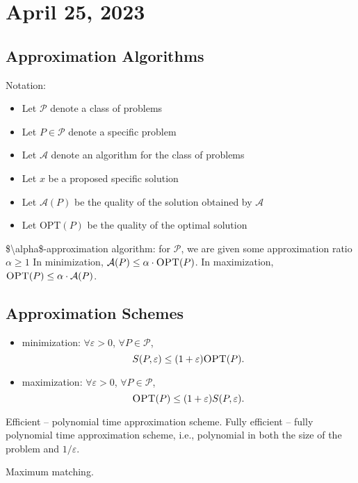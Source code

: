 \section{April 25, 2023}

\subsection{Approximation Algorithms}

Notation:
\begin{itemize}
    \item Let $\mathcal{P}$ denote a class of problems
    \item Let $P\in \mathcal{P}$ denote a specific problem 
    \item Let $\mathcal{A}$ denote an algorithm for the class of problems
    \item Let $x$ be a proposed specific solution
    \item Let $\mathcal{A}(P)$ be the quality of the solution obtained by $\mathcal{A}$
    \item Let \textsc{OPT}$(P)$ be the quality of the optimal solution
\end{itemize}

\ac{$\alpha$-approximation algorithm}: for $\mathcal{P}$, we are given some approximation ratio $\alpha \geq 1$ In minimization, $\mathcal{A}(P)\leq \alpha\cdot \textsc{OPT}(P)$. In maximization, $\textsc{OPT}(P)\leq \alpha\cdot \mathcal{A}(P)$.

\subsection{Approximation Schemes}

\begin{itemize}
    \item minimization: $\forall \varepsilon > 0$, $\forall P\in \mathcal{P}$, 
    \[S(P,\varepsilon) \leq (1+\varepsilon)\textsc{OPT}(P).\]
    \item maximization: $\forall \varepsilon > 0$, $\forall P\in \mathcal{P}$, 
    \[\textsc{OPT}(P)\leq (1+\varepsilon)S(P,\varepsilon).\]
\end{itemize}

Efficient -- polynomial time approximation scheme. 
Fully efficient -- fully polynomial time approximation scheme, i.e., polynomial in both the size of the problem and $1/\varepsilon$. 

\begin{example}
\exlabel

Maximum matching.
\end{example}

